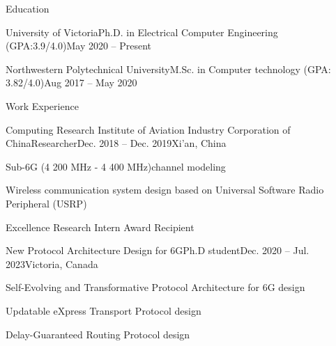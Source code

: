 \documentclass[]{puyang-resume}
\begin{document}
\resumeheader
{}
{}
{}
{}
{}

\begin{section}{Education}
    \begin{subsectionnobullet}{University of Victoria}{Ph.D. in Electrical Computer Engineering (GPA:3.9/4.0)}{}{May 2020 -- Present}
    \end{subsectionnobullet}
    
    \begin{subsectionnobullet}{Northwestern Polytechnical University}{M.Sc. in Computer technology (GPA: 3.82/4.0)}{}{Aug 2017 -- May 2020}
    \end{subsectionnobullet}
\end{section}



\begin{section}{Work Experience}
    \begin{subsection}{Computing Research Institute of Aviation Industry Corporation of China}{Researcher}{Dec. 2018 -- Dec. 2019}{Xi'an, China}
        \item Sub-6G (4 200 MHz - 4 400 MHz)channel modeling
        \item Wireless communication system design based on Universal Software Radio Peripheral (USRP)
        \item Excellence Research Intern Award Recipient
    \end{subsection}

    \begin{subsection}{New Protocol Architecture Design for 6G}{Ph.D student}{Dec. 2020 -- Jul. 2023}{Victoria, Canada}
        \item Self-Evolving and Transformative Protocol Architecture for 6G design
        \item Updatable eXpress Transport Protocol design
        \item Delay-Guaranteed Routing Protocol design
    \end{subsection}
\end{section}
\end{document}
